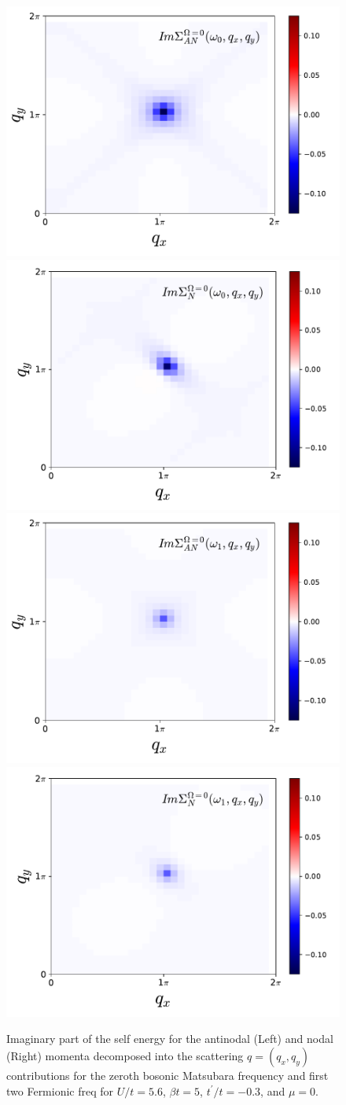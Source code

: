\begin{figure}[ht]
\centering
    \includegraphics[width=0.48\linewidth]{fig3/c_mu_0_sigma_AN_nu1.pdf}
    \includegraphics[width=0.48\linewidth]{fig3/c_mu_0_sigma_node_nu1.pdf}\\
    \includegraphics[width=0.48\linewidth]{fig3/c_mu_0_sigma_AN_nu2.pdf}
    \includegraphics[width=0.48\linewidth]{fig3/c_mu_0_sigma_node_nu2.pdf}
    
\caption{  Imaginary part of the self energy for the antinodal (Left) and nodal (Right) momenta decomposed into the scattering $q=(q_x,q_y)$ contributions for the zeroth bosonic Matsubara frequency and first two Fermionic freq for $U/t=5.6$, $\beta t =5$, $t^\prime /t=-0.3$, and $\mu=0$.
\label{fig:sigma}}
\end{figure}

